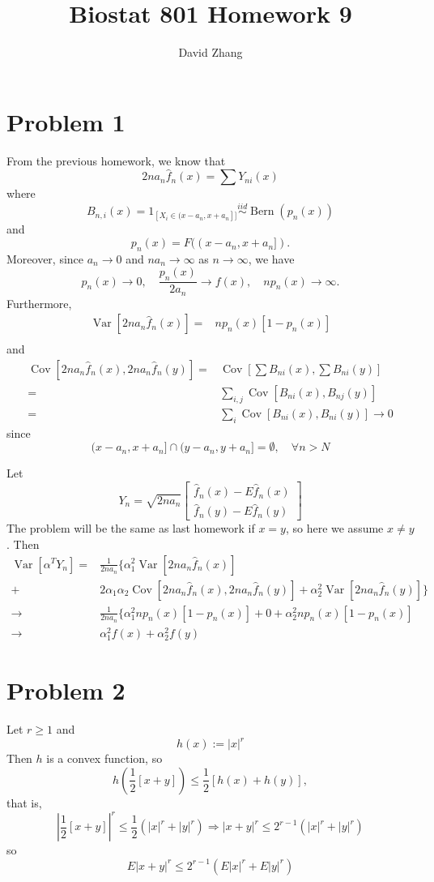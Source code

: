 \documentclass{article}
\title{Biostat 801 Homework 9}
\author{David Zhang}
\newcommand{\hf}{\hat{f}}
\newcommand{\Bern}{\operatorname{Bern}}
\newcommand{\iid}{\overset{iid}{\sim}}
\newcommand{\Var}{\operatorname{Var}}
\newcommand{\Cov}{\operatorname{Cov}}
\begin{document}
\maketitle

\section{Problem 1}

From the previous homework, we know that
\[
  2na_n\hf_n(x) = \sum Y_{ni}(x)
\]
where
\[
  B_{n,i}(x) = 1_{[X_i \in (x - a_n, x+a_n]]} \iid \Bern(p_n(x))
\]
and
\[
  p_n(x) = F((x - a_n, x+a_n]).
\]
Moreover, since $a_n \to 0$ and $na_n \to \infty$ as $n \to \infty$,
we have
\[
  p_n(x) \to 0,\quad \frac{p_n(x)}{2a_n} \to f(x), \quad np_n(x) \to
  \infty.
\]
Furthermore,
\begin{align*}
  \Var[2na_n\hf_n(x)] = & np_n(x)[1-p_n(x)] \\
\end{align*}
and
\begin{align*}
  \Cov[2na_n\hf_n(x), 2na_n\hf_n(y)]
  = & \Cov\left[\sum B_{ni}(x), \sum B_{ni}(y)\right] \\
  = & \sum_{i,j} \Cov[B_{ni}(x), B_{nj}(y)] \\
  = & \sum_{i} \Cov[B_{ni}(x), B_{ni}(y)] \to 0
\end{align*}
since
\[
  (x - a_n, x+ a_n] \cap (y - a_n, y+ a_n] = \emptyset, \quad \forall n > N
\]


Let
\[
  Y_n = \sqrt{2na_n}
  \begin{bmatrix}
    \hf_n(x) - E \hf_n(x) \\
    \hf_n(y) - E \hf_n(y)
  \end{bmatrix}
\]
The problem will be the same as last homework if $x = y$, so here we assume $x \neq y$.
Then
\begin{align*}
  \Var[\alpha^T Y_n]
  = & \frac{1}{2na_n}
      \{
      \alpha_1^2 \Var[2na_n\hf_n(x)] \\
  + & 2\alpha_1\alpha_2 \Cov[2na_n\hf_n(x), 2na_n\hf_n(y)]
      + \alpha_2^2 \Var[2na_n\hf_n(y)]
      \} \\
  \to & \frac{1}{2na_n} \{\alpha_1^2 n p_n(x) [1-p_n(x)]
        + 0 + \alpha_2^2 n p_n(x) [1-p_n(x)] \\
  \to & \alpha_1^2 f(x) + \alpha_2^2 f(y)
\end{align*}
  
\section{Problem 2}
Let $r \geq 1$ and
\[
  h(x) := |x|^r
\]
Then $h$ is a convex function, so
\[
  h(\frac{1}{2} [x + y]) \leq \frac{1}{2} [h(x) + h(y)],
\]
that is,
\[
  |\frac{1}{2} [x + y]|^r \leq \frac{1}{2} (|x|^r + |y|^r)
  \Rightarrow |x + y|^r \leq 2^{r-1} (|x|^r + |y|^r)
\]
so
\[
  E |x + y|^r \leq 2^{r-1} (E|x|^r + E|y|^r)
\]
\end{document}
